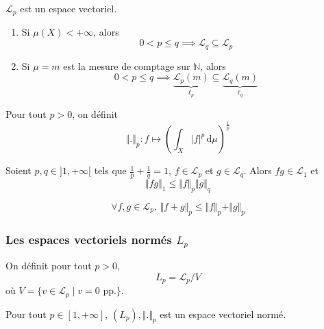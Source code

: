   \begin{proposition}
    $\mathcal{L}_p$ est un espace vectoriel.
  \end{proposition}

  \begin{proposition}
    \begin{enumerate}[label={\bfseries(\roman*)}]
      \item Si $\mu(X) < +\infty$, alors
      \[ 0 < p \leq q \implies \mathcal{L}_q \subseteq \mathcal{L}_p \]
      \item Si $\mu = m$ est la mesure de comptage sur $\mathbb{N}$, alors
      \[ 0 < p \leq q \implies \underbrace{\mathcal{L}_p(m)}_{\ell_p} \subseteq \underbrace{\mathcal{L}_q(m)}_{\ell_q} \]
    \end{enumerate}
  \end{proposition}

  \begin{definition}
    Pour tout $p > 0$, on définit
    \[ \Vert . \Vert_p : f \mapsto \left( \int_X \vert f \vert^p \, \mathrm{d}\mu \right)^{\frac{1}{p}} \]
  \end{definition}

  \begin{theorem}
    Soient $p, q \in ]1, +\infty[$ tels que $\frac{1}{p} + \frac{1}{q} = 1$, $f \in \mathcal{L}_p$ et $g \in \mathcal{L}_q$. Alors $fg \in \mathcal{L}_1$ et
    \[ \Vert fg \Vert_1 \leq \Vert f \Vert_p \Vert g \Vert_q \]
  \end{theorem}

  \begin{theorem}
    \[ \forall f, g \in \mathcal{L}_p, \, \Vert f + g \Vert_p \leq \Vert f \Vert_p + \Vert g \Vert_p \]
  \end{theorem}

  \subsubsection{Les espaces vectoriels normés \texorpdfstring{$L_p$}{Lₚ}}


  \begin{definition}
    On définit pour tout $p > 0$,
    \[ L_p = \mathcal{L}_p / V \]
    où $V = \{ v \in \mathcal{L}_p \mid v = 0 \text{ pp.} \}$.
  \end{definition}

  \begin{theorem}
    Pour tout $p \in [1, +\infty]$, $(L_p), \Vert . \Vert_p$ est un espace vectoriel normé.
  \end{theorem}

